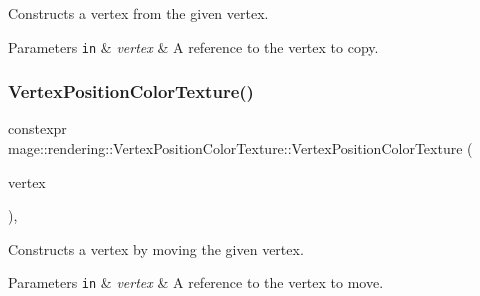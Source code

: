 Constructs a vertex from the given vertex.


\begin{DoxyParams}[1]{Parameters}
\mbox{\tt in}  & {\em vertex} & A reference to the vertex to copy. \\
\hline
\end{DoxyParams}
\hypertarget{structmage_1_1rendering_1_1_vertex_position_color_texture_a7747df2151f6b904570bcdcc96898c75}{}\label{structmage_1_1rendering_1_1_vertex_position_color_texture_a7747df2151f6b904570bcdcc96898c75} 
\subsubsection{\texorpdfstring{Vertex\+Position\+Color\+Texture()}{VertexPositionColorTexture()}\hspace{0.1cm}{\footnotesize\ttfamily [4/4]}}
{\footnotesize\ttfamily constexpr mage\+::rendering\+::\+Vertex\+Position\+Color\+Texture\+::\+Vertex\+Position\+Color\+Texture (\begin{DoxyParamCaption}\item[{\hyperlink{structmage_1_1rendering_1_1_vertex_position_color_texture}{Vertex\+Position\+Color\+Texture} \&\&}]{vertex }\end{DoxyParamCaption})\hspace{0.3cm}{\ttfamily [default]}, {\ttfamily [noexcept]}}

Constructs a vertex by moving the given vertex.


\begin{DoxyParams}[1]{Parameters}
\mbox{\tt in}  & {\em vertex} & A reference to the vertex to move. \\
\hline
\end{DoxyParams}
\hypertarget{structmage_1_1rendering_1_1_vertex_position_color_texture_a702ec0ffbe8eae3db1e8149f3124135d}{}\label{structmage_1_1rendering_1_1_vertex_position_color_texture_a702ec0ffbe8eae3db1e8149f3124135d} 
